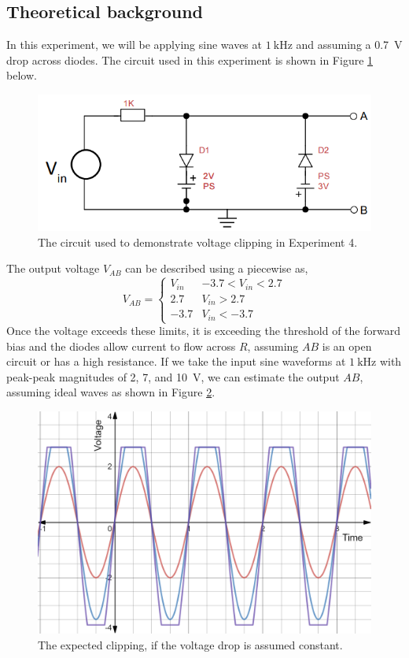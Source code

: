 \documentclass{report}
\begin{document}
\subsection{Theoretical background}
In this experiment, we will be applying sine waves at $\SI{1}{\kHz}$ and assuming a \SI{0.7}{\V} drop across diodes. The circuit used in this experiment is shown in Figure \ref{fig:exp4ckt} below. 
\begin{figure}[H]
	\centering
	\includegraphics[width=0.6\linewidth]{exp4ckt}
	\caption{The circuit used to demonstrate voltage clipping in Experiment 4.}
	\label{fig:exp4ckt}
\end{figure}
The output voltage $V_{AB}$ can be described using a piecewise as, \begin{equation}
	V_{AB} = \begin{cases}
		V_{in} & -3.7 < V_{in} < 2.7 \\
		2.7 & V_{in} > 2.7 \\
		-3.7 & V_{in} < -3.7
	\end{cases}
\end{equation}
Once the voltage exceeds these limits, it is exceeding the threshold of the forward bias and the diodes allow current to flow across $R$, assuming $AB$ is an open circuit or has a high resistance. If we take the input sine waveforms at $\SI{1}{\kHz}$ with peak-peak magnitudes of \num{2}, \num{7}, and \SI{10}{\V}, we can estimate the output $AB$, assuming ideal waves as shown in Figure \ref{fig:exp4waveforms}.
\begin{figure}[h]
	\centering
	\includegraphics[width=0.4\linewidth]{exp4waveforms}
	\caption{The expected clipping, if the voltage drop is assumed constant.}
	\label{fig:exp4waveforms}
\end{figure}
\end{document}
